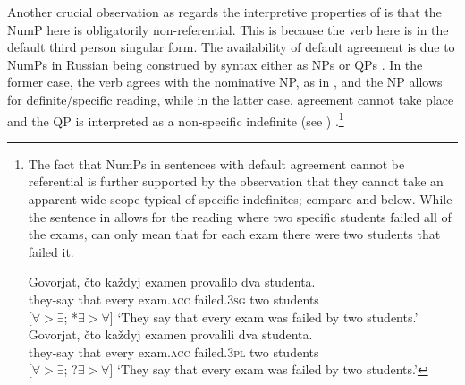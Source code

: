 \documentclass[output=paper,
modfonts,
newtxmath,
hidelinks
]{langscibook}
\begin{document}
Another crucial observation as regards the interpretive properties of  is that the NumP here is obligatorily non-referential. This is because the verb here is in the default third person singular form. The availability of default agreement is due to NumPs in Russian being construed by syntax either as NPs or QPs \citep{Pesetsky1982}. In the former case, the verb agrees with the nominative NP, as in , and the NP allows for definite/specific reading, while in the latter case, agreement cannot take place and the QP is interpreted as a non-specific indefinite (see ) \citep{Titov2012}.\footnote{\label{fn19}The fact that NumPs in sentences with default agreement cannot be referential is further supported by the observation that they cannot take an apparent wide scope typical of specific indefinites; compare  and  below. While the sentence in  allows for the reading where two specific students failed all of the exams,  can only mean that for each exam there were two students that failed it.   

\ea \label{fn19i}
\gll Govorjat, čto každyj examen provalilo dva studenta. \\
	 they-say  that  every  exam.\textsc{acc}  failed.\textsc{3sg}  two   students \\\hfill [$\forall > \exists$; *$\exists > \forall$]
\glt `They say that every exam was failed by two students.'  
\z
\ea \label{fn19ii}
\gll Govorjat, čto každyj examen provalili dva studenta. \\ 
	 they-say  that  every  exam.\textsc{acc}  failed.\textsc{3pl}  two   students  \\\hfill [$\forall > \exists$; ?$\exists > \forall$]
\glt `They say that every exam was failed by two students.'
\z
}  
\ea \label{ex23}
	\z
\z           
\end{document}
